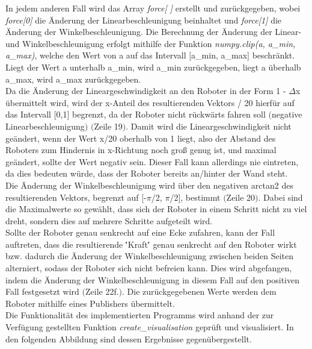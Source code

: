 \documentclass[12pt, a4paper]{report}
\begin{document}
In jedem anderen Fall wird das Array \textit{force[ ]} erstellt und zurückgegeben, wobei \textit{force[0]} die Änderung der Linearbeschleunigung beinhaltet und \textit{force[1]} die Änderung der Winkelbeschleunigung. Die Berechnung der Änderung der Linear- und Winkelbeschleunigung erfolgt mithilfe der Funktion \textit{numpy.clip(a, a\_min, a\_max)}, welche den Wert von a auf das Intervall $[$a\_min, a\_max$]$ beschränkt. Liegt der Wert a unterhalb a\_min, wird a\_min zurückgegeben, liegt a überhalb a\_max, wird a\_max zurückgegeben. \\
Da die Änderung der Lineargeschwindigkeit an den Roboter in der Form 1 - $\Delta$x übermittelt wird, wird der x-Anteil des resultierenden Vektors / 20 hierfür auf das Intervall $[$0,1$]$ begrenzt, da der Roboter nicht rückwärts fahren soll $($negative Linearbeschleunigung$)$ $($Zeile 19$)$. Damit wird die Lineargeschwindigkeit nicht geändert, wenn der Wert x/20 oberhalb von 1 liegt, also der Abstand des Roboters zum Hindernis in x-Richtung noch groß genug ist, und maximal geändert, sollte der Wert negativ sein. Dieser Fall kann allerdings nie eintreten, da dies bedeuten würde, dass der Roboter bereits an/hinter der Wand steht.\\
Die Änderung der Winkelbeschleunigung wird über den negativen arctan2 des resultierenden Vektors, begrenzt auf $[$-$\pi$/2, $\pi$/2$]$, bestimmt $($Zeile 20$)$. Dabei sind die Maximalwerte so gewählt, dass sich der Roboter in einem Schritt nicht zu viel dreht, sondern dies auf mehrere Schritte aufgeteilt wird.\\
Sollte der Roboter genau senkrecht auf eine Ecke zufahren, kann der Fall auftreten, dass die resultierende \''Kraft\'' genau senkrecht auf den Roboter wirkt bzw. dadurch die Änderung der Winkelbeschleunigung zwischen beiden Seiten alterniert, sodass der Roboter sich nicht befreien kann. Dies wird abgefangen, indem die Änderung der Winkelbeschleunigung in diesem Fall auf den positiven Fall festgesetzt wird $($Zeile  22f.$)$.
Die zurückgegebenen Werte werden dem Roboter mithilfe eines Publishers übermittelt.\\


Die Funktionalität des implementierten Programms wird anhand der zur Verfügung gestellten Funktion \textit{create\_visualisation} geprüft und visualisiert. In den folgenden Abbildung sind dessen Ergebnisse gegenübergestellt.\newpage
\end{document}
